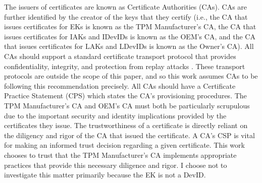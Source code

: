 The issuers of  certificates are known as Certificate Authorities (CAs). CAs are further identified by the creator of the keys that they certify (i.e., the CA that issues certificates for EKs is known as the TPM Manufacturer's CA, the CA that issues certificates for IAKs and IDevIDs is known as the OEM's CA, and the CA that issues certificates for LAKs and LDevIDs is known as the Owner's CA). All CAs should support a standard certificate transport protocol that provides confidentiality, integrity, and protection from replay attacks \cite{DevIDSpec-TCG}. These transport protocols are outside the scope of this paper, and so this work assumes CAs to be following this recommendation precisely. All CAs should have a Certificate Practice Statement (CPS) which states the CA's provisioning procedures.  The TPM Manufacturer's CA and OEM's CA must both be particularly scrupulous due to the important security and identity implications provided by the certificates they issue. The trustworthiness of a certificate is directly reliant on the diligency and rigor of the CA that issued the certificate. A CA's CSP is vital for making an informed trust decision regarding a given certificate.
This work chooses to trust that the TPM Manufacturer's CA implements appropriate practices that provide this necessary diligence and rigor. I choose not to investigate this matter primarily because the EK is not a DevID. %


%
%


